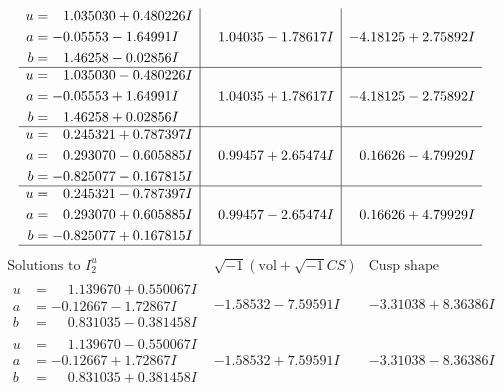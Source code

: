 \documentclass[1p]{elsarticle_modified}
\theoremstyle{definition}
\newcommand{\I}{\sqrt{-1}}
\begin{document}
$$\begin{array}{c|c|c}
\begin{aligned}
u &= \phantom{-}1.035030 + 0.480226 I \\
a &= -0.05553 - 1.64991 I \\
b &= \phantom{-}1.46258 - 0.02856 I\end{aligned}
 & \phantom{-}1.04035 - 1.78617 I & -4.18125 + 2.75892 I \\ \hline\begin{aligned}
u &= \phantom{-}1.035030 - 0.480226 I \\
a &= -0.05553 + 1.64991 I \\
b &= \phantom{-}1.46258 + 0.02856 I\end{aligned}
 & \phantom{-}1.04035 + 1.78617 I & -4.18125 - 2.75892 I \\ \hline\begin{aligned}
u &= \phantom{-}0.245321 + 0.787397 I \\
a &= \phantom{-}0.293070 - 0.605885 I \\
b &= -0.825077 - 0.167815 I\end{aligned}
 & \phantom{-}0.99457 + 2.65474 I & \phantom{-}0.16626 - 4.79929 I \\ \hline\begin{aligned}
u &= \phantom{-}0.245321 - 0.787397 I \\
a &= \phantom{-}0.293070 + 0.605885 I \\
b &= -0.825077 + 0.167815 I\end{aligned}
 & \phantom{-}0.99457 - 2.65474 I & \phantom{-}0.16626 + 4.79929 I\\
 \hline 
 \end{array}$$\newpage$$\begin{array}{c|c|c}  
\text{Solutions to }I^u_{2}& \I (\text{vol} + \sqrt{-1}CS) & \text{Cusp shape}\\
 \hline 
\begin{aligned}
u &= \phantom{-}1.139670 + 0.550067 I \\
a &= -0.12667 - 1.72867 I \\
b &= \phantom{-}0.831035 - 0.381458 I\end{aligned}
 & -1.58532 - 7.59591 I & -3.31038 + 8.36386 I \\ \hline\begin{aligned}
u &= \phantom{-}1.139670 - 0.550067 I \\
a &= -0.12667 + 1.72867 I \\
b &= \phantom{-}0.831035 + 0.381458 I\end{aligned}
 & -1.58532 + 7.59591 I & -3.31038 - 8.36386 I \\ \hline\begin{aligned}

\end{aligned}
\end{array}$$
\end{document}
